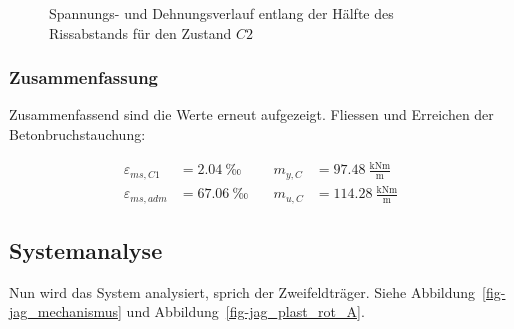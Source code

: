 \documentclass[
  11pt,
  letterpaper,
]{scrreprt}
\begin{document}
\begin{figure}[H]

\begin{minipage}{0.50\linewidth}



\end{minipage}%
%
\begin{minipage}{0.50\linewidth}



\end{minipage}%

\caption{\label{fig-jag_zustand_c2}Spannungs- und Dehnungsverlauf
entlang der Hälfte des Rissabstands für den Zustand \(C2\)}

\end{figure}%

\subsubsection{Zusammenfassung}\label{zusammenfassung-2}

Zusammenfassend sind die Werte erneut aufgezeigt. Fliessen und Erreichen
der Betonbruchstauchung:

\[
\begin{aligned}
\varepsilon_{m s , C1}& = 2.04 \ \mathrm{‰} \quad & m_{y , C}& = 97.48 \ \frac{\mathrm{kNm}}{\mathrm{m}} \\ 
\varepsilon_{m s , adm}& = 67.06 \ \mathrm{‰} \quad & m_{u , C}& = 114.28 \ \frac{\mathrm{kNm}}{\mathrm{m}} \end{aligned}
\]

\subsection{Systemanalyse}\label{systemanalyse-1}

Nun wird das System analysiert, sprich der Zweifeldträger. Siehe
Abbildung~\ref{fig-jag_mechanismus} und
Abbildung~\ref{fig-jag_plast_rot_A}.
\end{document}
